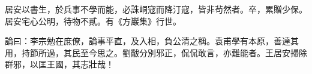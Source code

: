 \begin{pinyinscope}
 居安以書生，於兵事不學而能，必誅峒寇而降汀寇，皆非茍然者。卒，累贈少保。
 居安宅心公明，待物不貳。有《方巖集》行世。



 論曰：李宗勉在庶僚，論事平直，及入相，負公清之稱。袁甫學有本原，善達其用，持節所過，其民至今思之。劉黻分別邪正，侃侃敢言，亦難能者。王居安掃除群邪，以匡王國，其志壯哉！



\end{pinyinscope}